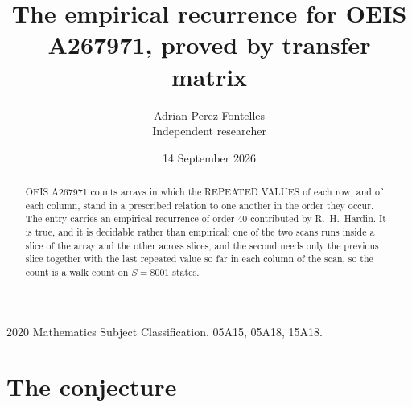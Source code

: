 \documentclass[11pt,a4paper]{article}
\title{The empirical recurrence for OEIS A267971, proved by transfer matrix}
\author{Adrian Perez Fontelles\\ \small Independent researcher}
\date{14 September 2026}
\theoremstyle{plain}
\theoremstyle{definition}
\begin{document}
\maketitle

\begin{abstract}
OEIS A267971 counts arrays in which the REPEATED VALUES of each row, and of each column, stand in a
prescribed relation to one another in the order they occur. The entry carries an empirical
recurrence of order $40$ contributed by R.~H.~Hardin. It is true, and it is decidable
rather than empirical: one of the two scans runs inside a slice of the array and the other
across slices, and the second needs only the previous slice together with the last repeated
value so far in each column of the scan, so the count is a walk count on $S=8001$ states.
\end{abstract}

\noindent\small 2020 Mathematics Subject Classification. 05A15, 05A18, 15A18.\normalsize

\section{The conjecture}
\end{document}
